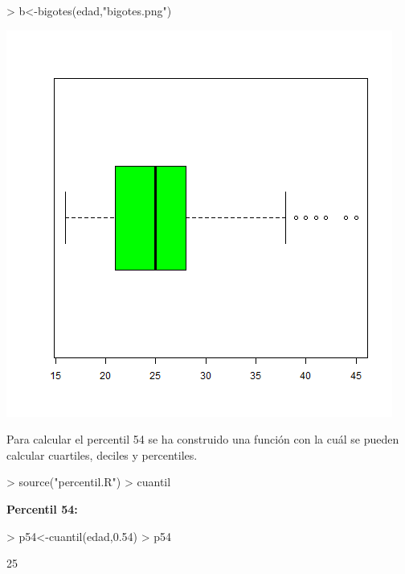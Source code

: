 \documentclass [a4paper] {article}
\begin{document}
\begin{Schunk}
\begin{Sinput}
> b<-bigotes(edad,"bigotes.png")
\end{Sinput}
\end{Schunk}
\includegraphics[width=\textwidth]{bigotes}

Para calcular el percentil 54 se ha construido una funci\'on con la cu\'al se pueden
calcular cuartiles, deciles y percentiles.
\begin{Schunk}
\begin{Sinput}
> source("percentil.R")
> cuantil
\end{Sinput}
\end{Schunk}

\textbf{Percentil 54:}
\begin{Schunk}
\begin{Sinput}
> p54<-cuantil(edad,0.54)
> p54
\end{Sinput}
\begin{Soutput}
[1] 25
\end{Soutput}
\end{Schunk}
\end{document}
